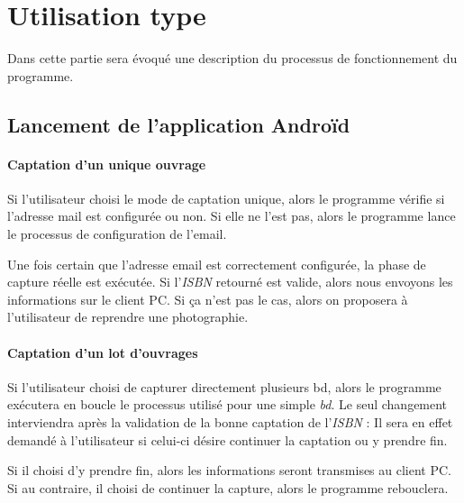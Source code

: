 \section{Utilisation type}
Dans cette partie sera évoqué une description du processus de fonctionnement du programme.

\subsection{Lancement de l'application Androïd}

\paragraph{Captation d'un unique ouvrage} 

Si l'utilisateur choisi le mode de captation unique, alors le programme vérifie si l'adresse mail est configurée ou non. 
Si elle ne l'est pas, alors le programme lance le processus de configuration de l'email. 

Une fois certain que l'adresse email est correctement configurée, la phase de capture réelle est exécutée. 
Si l'\emph{ISBN} retourné est valide, alors nous envoyons les informations sur le client PC. 
Si ça n'est pas le cas, alors on proposera à l'utilisateur de reprendre une photographie. 


\paragraph{Captation d'un lot d'ouvrages}
Si l'utilisateur choisi de capturer directement plusieurs bd, alors le programme exécutera en boucle le processus utilisé pour une simple \emph{bd}. 
Le seul changement interviendra après la validation de la bonne captation de l'\emph{ISBN} :
Il sera en effet demandé à l'utilisateur si celui-ci désire continuer la captation ou y prendre fin. 

Si il choisi d'y prendre fin, alors les informations seront transmises au client PC. 
Si au contraire, il choisi de continuer la capture, alors le programme rebouclera. 



